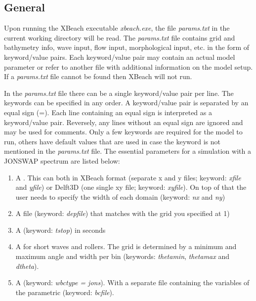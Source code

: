 \documentclass{article}
\begin{document}
\subsection{ General}

\noindent Upon running the XBeach executable \textit{xbeach.exe}, the file \textit{params.txt} in the current working directory will be read. The \textit{params.txt} file contains grid and bathymetry info, wave input, flow input, morphological input, etc. in the form of keyword/value pairs. Each keyword/value pair may contain an actual model parameter or refer to another file with additional information on the model setup. If a \textit{params.txt} file cannot be found then XBeach will not run.

\noindent In the \textit{params.txt} file there can be a single keyword/value pair per line. The keywords can be specified in any order. A keyword/value pair is separated by an equal sign (=). Each line containing an equal sign is interpreted as a keyword/value pair. Reversely, any lines without an equal sign are ignored and may be used for comments. Only a few keywords are required for the model to run, others have default values that are used in case the keyword is not mentioned in the \textit{params.txt} file. The essential parameters for a simulation with a JONSWAP spectrum are listed below:

\begin{enumerate}
\item  A . This can both in XBeach format (separate x and y files; keyword: \textit{xfile} and \textit{yfile}) or Delft3D (one single xy file; keyword: \textit{xyfile}). On top of that the user needs to specify the width of each domain (keyword: \textit{nx} and \textit{ny})

\item  A  file (keyword: \textit{depfile}) that matches with the grid you specified at 1)

\item  A  (keyword: \textit{tstop}) in seconds

\item  A  for short waves and rollers. The grid is determined by a minimum and maximum angle and width per bin (keywords: \textit{thetamin}, \textit{thetamax} and \textit{dtheta}).

\item  A  (keyword: \textit{wbctype = jons}). With a separate file containing the variables of the parametric (keyword: \textit{bcfile}).
\end{enumerate}
\end{document}

